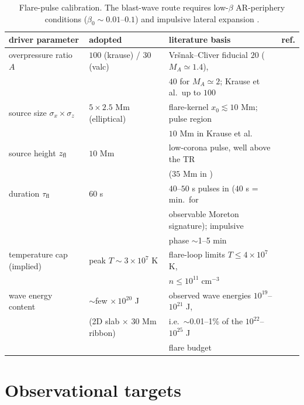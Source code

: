 \documentclass[11pt,a4paper]{article}
\begin{document}
\begin{table}[h]\centering\small
\begin{tabular}{llll}
\toprule
driver parameter & adopted & literature basis & ref.\\
\midrule
overpressure ratio $A$ & $100$ (krause) / $30$ (valc) & Vr\v{s}nak--Cliver fiducial $20$ ($M_A{\simeq}1.4$), & \cite{VrsnakCliver2008,Krause2015}\\
 & & $40$ for $M_A{\simeq}2$; Krause et al.\ up to $100$ & \\
source size $\sigma_x\times\sigma_z$ & $5\times2.5$ Mm (elliptical) & flare-kernel $x_0\lesssim10$ Mm; pulse region & \cite{VrsnakCliver2008,Krause2015}\\
 & & $10$ Mm in Krause et al. & \\
source height $z_{\rm fl}$ & $10$ Mm & low-corona pulse, well above the TR & \cite{VrsnakCliver2008,Krause2015}\\
 & & ($35$ Mm in \cite{Krause2015}) & \\
duration $\tau_{\rm fl}$ & $60$ s & $40$--$50$ s pulses in \cite{Krause2015} ($40$ s = min.\ for & \cite{Krause2015,VrsnakCliver2008}\\
 & & observable Moreton signature); impulsive & \\
 & & phase $\sim$1--5 min & \\
temperature cap (implied) & peak $T\sim3\times10^{7}$ K & flare-loop limits $T\le4\times10^{7}$ K, & \cite{Krause2015,Aschwanden2005}\\
 & & $n\le10^{11}\;\mathrm{cm^{-3}}$ & \\
wave energy content & $\sim$few$\,\times10^{20}$ J & observed wave energies $10^{19}$--$10^{21}$ J, & \cite{Ballai2005,Warmuth2015}\\
 & (2D slab $\times$ 30 Mm ribbon) & i.e.\ $\sim$0.01--1\% of the $10^{22}$--$10^{25}$ J & \cite{Emslie2012}\\
 & & flare budget & \\
\bottomrule
\end{tabular}
\caption{Flare-pulse calibration. The blast-wave route requires low-$\beta$ AR-periphery
conditions ($\beta_0\sim0.01$--$0.1$) and impulsive lateral expansion
\cite{VrsnakCliver2008,Pomoell2008}.}
\end{table}

\section{Observational targets}
\end{document}
